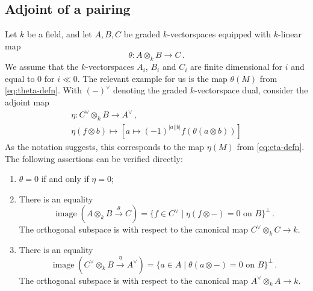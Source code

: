 \documentclass{amsart}
\numberwithin{equation}{section}
\theoremstyle{plain}
\theoremstyle{definition}
\theoremstyle{remark}
\newcommand{\image}{\operatorname{image}}
\begin{document}
\subsection*{Adjoint of a pairing}
Let $k$ be a field, and let $A,B,C$ be graded $k$-vectorspaces equipped with  $k$-linear map
\[
\theta \colon A\otimes_k B\longrightarrow C\,.
\]
We assume that the $k$-vectorspaces $A_i$, $B_i$ and $C_i$ are finite dimensional for $i$ and equal to $0$ for $i\ll 0$. The relevant example for us is the map $\theta(M)$ from \eqref{eq:theta-defn}. With $(-)^\vee$ denoting the graded $k$-vectorspace dual,  consider the adjoint map
\begin{gather*}
\eta  \colon C^\vee \otimes_k B\longrightarrow A^\vee \,, \\
\eta(f\otimes b) \mapsto \left[a\mapsto (-1)^{|a||b|}f(\theta(a\otimes b)) \right]
\end{gather*}
As the notation suggests, this corresponds to the map $\eta(M)$ from \eqref{eq:eta-defn}. The following assertions can be verified directly:
\begin{enumerate}[\quad\rm(1)]
    \item 
    $\theta = 0$ if and only if $\eta = 0$;
    \item
There is an equality
\[
\image(A\otimes_k B\xrightarrow{\theta} C) = \{f\in C^\vee\mid \eta(f\otimes-)=0 \text{ on } B\}^\perp \,.
\]
The orthogonal subspace is with respect to the canonical map $C^\vee\otimes_k C \to k$.
\item 
There is an equality
\[
\image(C^\vee\otimes_k B\xrightarrow{\eta} A^\vee) = \{a\in A\mid \theta(a\otimes-)=0 \text{ on } B\}^\perp \,.
\]
The orthogonal subspace is with respect to the canonical map $A^\vee\otimes_k A \to k$.
\end{enumerate}
\end{document}
